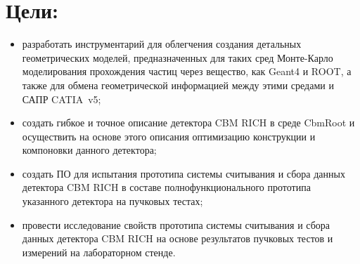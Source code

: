 \section*{Цели:}

\begin{itemize}
\item{разработать инструментарий для облегчения создания детальных геометрических моделей, предназначенных для таких сред Монте-Карло моделирования прохождения частиц через вещество, как Geant4 и ROOT, а также для обмена геометрической информацией между этими средами и САПР CATIA~v5;}
\item{создать гибкое и точное описание детектора CBM RICH в среде CbmRoot и осуществить на основе этого описания оптимизацию конструкции и компоновки данного детектора;}
\item{создать ПО для испытания прототипа системы считывания и сбора данных детектора CBM RICH в составе полнофункционального прототипа указанного детектора на пучковых тестах;}
\item{провести исследование свойств прототипа системы считывания и сбора данных детектора CBM RICH на основе результатов пучковых тестов и измерений на лабораторном стенде.}
\end{itemize}
